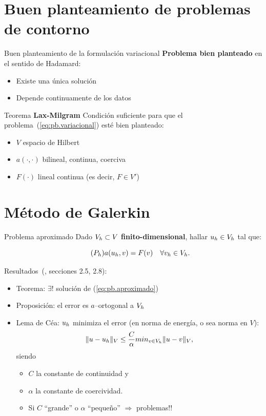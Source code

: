 \documentclass[10pt,leqno]{beamer}
\begin{document}
\section{Buen planteamiento de problemas de contorno}
\label{sec:buen-plant-de}

\begin{frame}{Buen planteamiento de la formulación variacional}
  \textbf{Problema bien planteado} en el sentido de Hadamard:
  \begin{itemize}
  \item Existe una única solución
  \item Depende continuamente de los datos
  \end{itemize}

  \begin{block}{Teorema \textbf{Lax-Milgram}}
    Condición suficiente para que el
    problema~(\ref{eq:pb.variacional}) esté bien planteado:
    \begin{itemize}
    \item $V$ espacio de Hilbert
    \item $a(\cdot,\cdot)$ bilineal, continua, coerciva
    \item $F(\cdot)$ lineal continua (es decir, $F\in V'$)
    \end{itemize}
  \end{block}
\end{frame}

\section{Método de Galerkin}
\label{sec:buen-plant-de-1}

\begin{frame}{Problema aproximado}
  Dado $\Vh\subset V$ \textbf{finito-dimensional}, hallar $\uh\in\Vh$ tal que:
  \begin{block}{}
    \vspace{-2.5ex}
    \begin{equation}
      \label{eq:pb.aproximado}
      \tag{$P_h$}
      a(\uh,v)= F(v) \quad \forall \vh \in \Vh.
    \end{equation}
  \end{block}
  Resultados~(\cite{Brenner-Scott:08}, secciones 2.5, 2.8):
  \begin{itemize}
  \item Teorema: $\exists!$ solución de (\ref{eq:pb.aproximado})
  \item Proposición: el error es $a$--ortogonal a $\Vh$
  \item Lema de Céa: $\uh$ minimiza el error (en norma de energía, o
    sea norma en $V$):
    $$\norm[V]{u-\uh} \le \frac{C}{\alpha} min_{v\in\Vh}\norm[V]{u-v},$$
    siendo
    \begin{itemize}
    \item $C$ la constante de continuidad y
    \item $\alpha$ la constante de coercividad.
    \item Si $C$ ``grande'' o $\alpha$ ``pequeño'' $\Rightarrow$ problemas!!
    \end{itemize}
  \end{itemize}
\end{frame}
\end{document}
